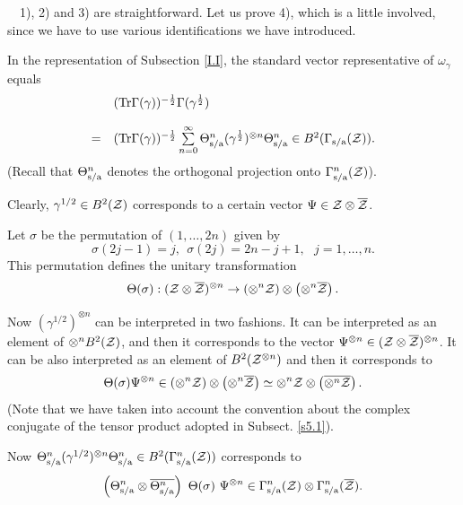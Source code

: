\documentclass{svmult}
\newcommand{\beq}{\begin{equation}}
\newcommand{\eeq}{\end{equation}}
\def\bar{\overline}
\def\sa{{\rm s/a}}
\def\proof{
\noindent{\bf Proof.}\ \ }
\def\cZ{{\cal Z}}
\def\Tr{{\rm Tr}}
\def\Tr{{\rm Tr}}
\begin{document}
\proof 1), 2) and 3) are straightforward. Let us prove
4), which is a little involved, since we have to use various identifications
we have introduced.


In the representation of Subsection \ref{I.I}, the standard vector
representative of $\omega_\gamma$ equals
\[\begin{array}{rl}&
(\Tr\Gamma(\gamma))^{-\frac12}\Gamma(\gamma^{\frac12})\\[4mm]
=&(\Tr\Gamma(\gamma))^{-\frac12}\sum\limits_{n=0}^\infty
\Theta_\sa^n(\gamma^{\frac12})^{\otimes n}
\Theta_\sa^n
\in B^2(\Gamma_\sa(\cZ)).\end{array}\]
(Recall that $\Theta_\sa^n$ denotes the orthogonal projection onto
$\Gamma_\sa^n(\cZ)$).

Clearly, $\gamma^{1/2}\in B^2(\cZ)$ corresponds to a certain vector
$\Psi\in\cZ\otimes\bar\cZ$. 




Let $\sigma$ be the permutation of $(1,\dots,2n)$
 given by
\[\sigma(2j-1)=j,\ \ \sigma(2j)=2n-j+1,\ \ \ j=1,\dots,n.\]
This permutation defines the unitary transformation
\[\Theta(\sigma):(\cZ\otimes\bar\cZ)^{ \otimes n}\to
\left(\otimes^n\cZ\right)\otimes\left(\otimes^n\bar\cZ\right).\]




Now $(\gamma^{1/2})^{\otimes n}$ can be interpreted in two fashions.
It can be interpreted as an element of $\otimes^n B^2(\cZ)$, and then it
corresponds to the vector $\Psi^{\otimes n}\in
(\cZ\otimes\bar\cZ)^{ \otimes n}$. It can be also interpreted as an element of
$ B^2(\cZ^{\otimes n})$
 and then it corresponds to
\[\Theta(\sigma)\Psi^{\otimes
  n}\in \left(\otimes^n\cZ\right)\otimes\left(\otimes^n\bar\cZ\right)
 \simeq \otimes^n\cZ\otimes\left(\bar{\otimes^n\cZ}\right).\]
(Note that we have taken into account the convention about the complex 
conjugate of
the tensor product adopted in Subsect. \ref{s5.1}).

Now $\Theta_\sa^n(\gamma^{1/2})^{\otimes n}\Theta_\sa^n\in
B^2(\Gamma_\sa^n(\cZ))$ corresponds to
\beq\left(\Theta_\sa^n\otimes\bar{\Theta_\sa^n}\right)\ 
\Theta(\sigma)\ \Psi^{\otimes
  n}\in\Gamma_\sa^n(\cZ)\otimes\Gamma_\sa^n(\bar\cZ).\label{lal}\eeq
\end{document}
